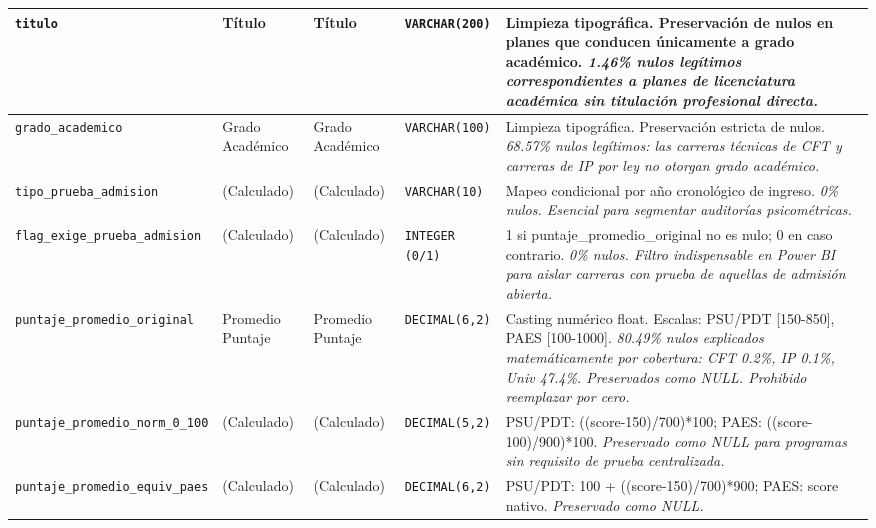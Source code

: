 {\begin{longtable}{|p{3.0cm}|p{2.0cm}|p{2.0cm}|p{1.6cm}|p{6.4cm}|}
\hline
\texttt{\footnotesize titulo} & Título & Título & \texttt{\footnotesize VARCHAR(200)} & Limpieza tipográfica. Preservación de nulos en planes que conducen únicamente a grado académico. \newline \textit{\footnotesize 1.46\% nulos legítimos correspondientes a planes de licenciatura académica sin titulación profesional directa.} \\
\hline
\texttt{\footnotesize grado\_academico} & Grado Académico & Grado Académico & \texttt{\footnotesize VARCHAR(100)} & Limpieza tipográfica. Preservación estricta de nulos. \newline \textit{\footnotesize 68.57\% nulos legítimos: las carreras técnicas de CFT y carreras de IP por ley no otorgan grado académico.} \\
\hline
\texttt{\footnotesize tipo\_prueba\_admision} & (Calculado) & (Calculado) & \texttt{\footnotesize VARCHAR(10)} & Mapeo condicional por año cronológico de ingreso. \newline \textit{\footnotesize 0\% nulos. Esencial para segmentar auditorías psicométricas.} \\
\hline
\texttt{\footnotesize flag\_exige\_prueba\_admision} & (Calculado) & (Calculado) & \texttt{\footnotesize INTEGER (0/1)} & 1 si puntaje\_promedio\_original no es nulo; 0 en caso contrario. \newline \textit{\footnotesize 0\% nulos. Filtro indispensable en Power BI para aislar carreras con prueba de aquellas de admisión abierta.} \\
\hline
\texttt{\footnotesize puntaje\_promedio\_original} & Promedio Puntaje & Promedio Puntaje & \texttt{\footnotesize DECIMAL(6,2)} & Casting numérico float. Escalas: PSU/PDT [150-850], PAES [100-1000]. \newline \textit{\footnotesize 80.49\% nulos explicados matemáticamente por cobertura: CFT 0.2\%, IP 0.1\%, Univ 47.4\%. Preservados como NULL. Prohibido reemplazar por cero.} \\
\hline
\texttt{\footnotesize puntaje\_promedio\_norm\_0\_100} & (Calculado) & (Calculado) & \texttt{\footnotesize DECIMAL(5,2)} & PSU/PDT: ((score-150)/700)*100; PAES: ((score-100)/900)*100. \newline \textit{\footnotesize Preservado como NULL para programas sin requisito de prueba centralizada.} \\
\hline
\texttt{\footnotesize puntaje\_promedio\_equiv\_paes} & (Calculado) & (Calculado) & \texttt{\footnotesize DECIMAL(6,2)} & PSU/PDT: 100 + ((score-150)/700)*900; PAES: score nativo. \newline \textit{\footnotesize Preservado como NULL.} \\

\end{longtable}}
